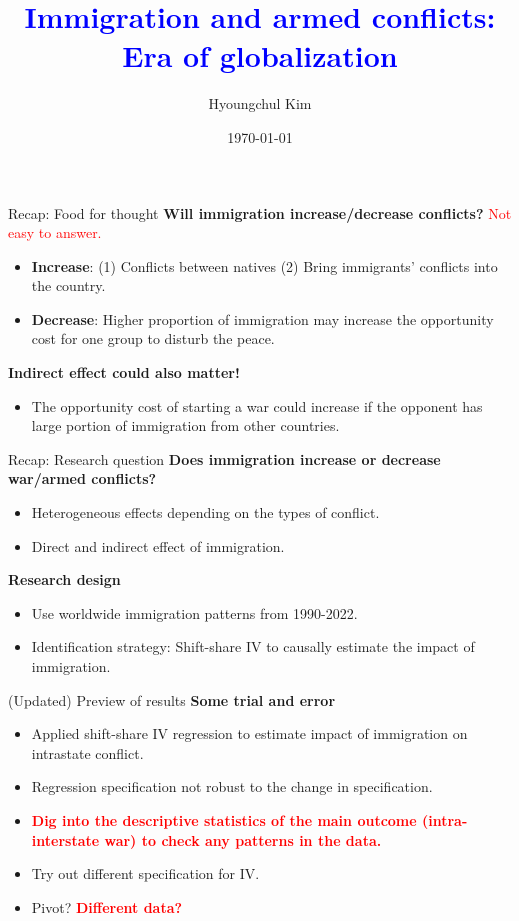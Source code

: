 \documentclass[notes,11pt, aspectratio=169]{beamer}
\title{\textcolor{blue}{Immigration and armed conflicts: Era of globalization}}
\author{Hyoungchul Kim}
\institute{Wharton UPenn}
\date{\today}
\begin{document}
\begin{frame}[plain]
	\titlepage
\end{frame}

\setcounter{framenumber}{0}

\begin{frame}{Recap: Food for thought}
	\textbf{Will immigration increase/decrease conflicts?} \textcolor{red}{Not easy to answer.}	
	\begin{itemize}
		\item \textbf{Increase}: (1) Conflicts between natives (2) Bring immigrants' conflicts into the country.  
		\item \textbf{Decrease}: Higher proportion of immigration may increase the opportunity cost for one group to disturb the peace.
	\end{itemize}\vspace{1em}

	\textbf{Indirect effect could also matter!}
	\begin{itemize}
		\item The opportunity cost of starting a war could increase if the opponent has large portion of immigration from other countries.
	\end{itemize}
\end{frame}

\begin{frame}{Recap: Research question}
	\textbf{Does immigration increase or decrease war/armed conflicts?}	
	\begin{itemize}
		\item Heterogeneous effects depending on the types of conflict.
		\item Direct and indirect effect of immigration.
	\end{itemize}\vspace{1em}

	\textbf{Research design}
	\begin{itemize}
		\item Use worldwide immigration patterns from 1990-2022.
		\item Identification strategy: Shift-share IV to causally estimate the impact of immigration.
	\end{itemize}
\end{frame}

\begin{frame}{(Updated) Preview of results}
	\textbf{Some trial and error}
	\begin{itemize}
		\item Applied shift-share IV regression to estimate impact of immigration on intrastate conflict.
		\item Regression specification not robust to the change in specification.
		\item \textcolor{red}{\textbf{Dig into the descriptive statistics of the main outcome (intra- interstate war) to check any patterns in the data.}}
		\item Try out different specification for IV.
		\item Pivot? \textcolor{red}{\textbf{Different data?}}
	\end{itemize}
\end{frame}
\end{document}
